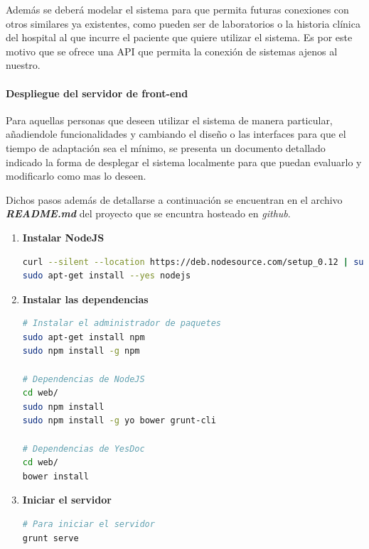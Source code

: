Además se deberá modelar el sistema para que permita futuras conexiones con otros similares ya existentes, como pueden ser de laboratorios o la historia clínica del hospital al que incurre el paciente que quiere utilizar el sistema. Es por este motivo que se ofrece una API que permita la conexión de sistemas ajenos al nuestro.


\paragraph{Despliegue del servidor de front-end}
Para aquellas personas que deseen utilizar el sistema de manera particular, añadiendole funcionalidades y cambiando el diseño o las interfaces para que el tiempo de adaptación sea el mínimo, se presenta un documento detallado indicado la forma de desplegar el sistema localmente para que puedan evaluarlo y modificarlo como mas lo deseen.

Dichos pasos además de detallarse a continuación se encuentran en el archivo \textit{\textbf{README.md}} del proyecto que se encuntra hosteado en \textit{github}.
\begin{enumerate}
\item \textbf{ Instalar NodeJS}

\begin{lstlisting}[language=bash]
curl --silent --location https://deb.nodesource.com/setup_0.12 | sudo bash -
sudo apt-get install --yes nodejs

\end{lstlisting}
\item \textbf{Instalar las dependencias}
\begin{lstlisting}[language=bash]
# Instalar el administrador de paquetes
sudo apt-get install npm
sudo npm install -g npm

# Dependencias de NodeJS
cd web/
sudo npm install
sudo npm install -g yo bower grunt-cli

# Dependencias de YesDoc
cd web/
bower install
\end{lstlisting}
\item \textbf{Iniciar el servidor}
\begin{lstlisting}[language=bash]
# Para iniciar el servidor
grunt serve
\end{lstlisting}


\end{enumerate}


